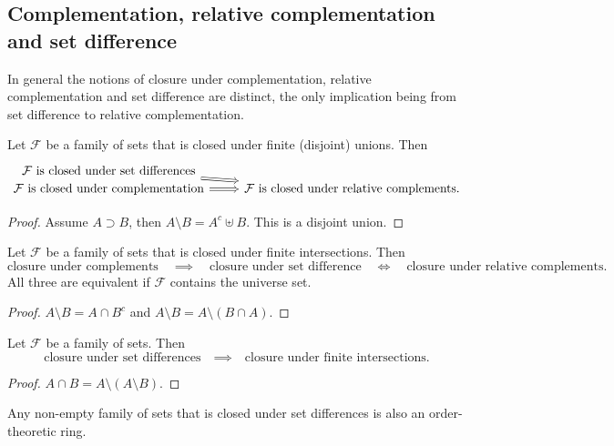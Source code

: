 \subsection{Complementation, relative complementation and set difference}
In general the notions of closure under complementation, relative complementation and set difference are distinct, the only implication being from set difference to relative complementation.

\begin{lemma} \label{lemma:complementTypesUnionClosure}
Let $\mathcal{F}$ be a family of sets that is closed under finite (disjoint) unions. Then
\[ \begin{tikzcd}[row sep=0]
\text{$\mathcal{F}$ is closed under set differences} \arrow[dr, Rightarrow] & \\
\text{$\mathcal{F}$ is closed under complementation} \arrow[r,Rightarrow] & \text{$\mathcal{F}$ is closed under relative complements.}
\end{tikzcd} \]
\end{lemma}
\begin{proof}
Assume $A\supset B$, then $A\setminus B = A^c \uplus B$. This is a disjoint union.
\end{proof}

\begin{lemma}
Let $\mathcal{F}$ be a family of sets that is closed under finite intersections. Then
\[ \text{closure under complements} \quad\implies\quad \text{closure under set difference} \quad\iff\quad \text{closure under relative complements.} \]
All three are equivalent if $\mathcal{F}$ contains the universe set.
\end{lemma}
\begin{proof}
$A\setminus B = A\cap B^c$ and $A\setminus B = A\setminus (B\cap A)$.
\end{proof}

\begin{lemma} \label{lemma:closureSetDifference}
Let $\mathcal{F}$ be a family of sets. Then
\[ \text{closure under set differences} \quad\implies\quad \text{closure under finite intersections.} \]
\end{lemma}
\begin{proof}
$A\cap B = A\setminus (A\setminus B)$.
\end{proof}

Any non-empty family of sets that is closed under set differences is also an order-theoretic ring.

